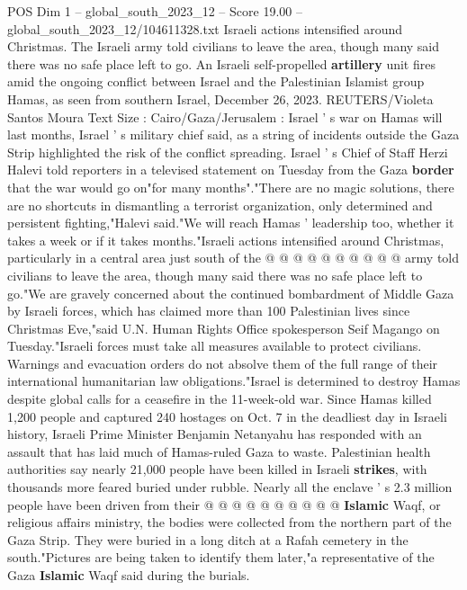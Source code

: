 \begin{textsample}{POS Dim 1 – global\_south\_2023\_12 – Score 19.00 – global\_south\_2023\_12/104611328.txt}  \label{ex:f1_pos_170}
Israeli actions intensified around Christmas.
The Israeli army told civilians to leave the area, though many said there was no safe place left to go.
An Israeli self-propelled \textbf{artillery} unit fires amid the ongoing conflict between Israel and the Palestinian Islamist group Hamas, as seen from southern Israel, December 26, 2023.
REUTERS/Violeta Santos Moura Text Size : Cairo/Gaza/Jerusalem : Israel ' s war on Hamas will last months, Israel ' s military chief said, as a string of incidents outside the Gaza Strip highlighted the risk of the conflict spreading.
Israel ' s Chief of Staff Herzi Halevi told reporters in a televised statement on Tuesday from the Gaza \textbf{border} that the war would go on"for many months"."There are no magic solutions, there are no shortcuts in dismantling a terrorist organization, only determined and persistent fighting,"Halevi said."We will reach Hamas ' leadership too, whether it takes a week or if it takes months."Israeli actions intensified around Christmas, particularly in a central area just south of the @ @ @ @ @ @ @ @ @ @ army told civilians to leave the area, though many said there was no safe place left to go."We are gravely concerned about the continued bombardment of Middle Gaza by Israeli forces, which has claimed more than 100 Palestinian lives since Christmas Eve,"said U.N.
Human Rights Office spokesperson Seif Magango on Tuesday."Israeli forces must take all measures available to protect civilians.
Warnings and evacuation orders do not absolve them of the full range of their international humanitarian law obligations."Israel is determined to destroy Hamas despite global calls for a ceasefire in the 11-week-old war.
Since Hamas killed 1,200 people and captured 240 hostages on Oct. 7 in the deadliest day in Israeli history, Israeli Prime Minister Benjamin Netanyahu has responded with an assault that has laid much of Hamas-ruled Gaza to waste.
Palestinian health authorities say nearly 21,000 people have been killed in Israeli \textbf{strikes}, with thousands more feared buried under rubble.
Nearly all the enclave ' s 2.3 million people have been driven from their @ @ @ @ @ @ @ @ @ @ \textbf{Islamic} Waqf, or religious affairs ministry, the bodies were collected from the northern part of the Gaza Strip.
They were buried in a long ditch at a Rafah cemetery in the south."Pictures are being taken to identify them later,"a representative of the Gaza \textbf{Islamic} Waqf said during the burials.

\end{textsample}
